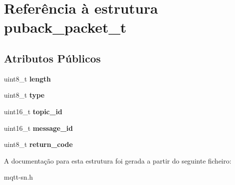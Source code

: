 \hypertarget{structpuback__packet__t}{\section{Referência à estrutura puback\+\_\+packet\+\_\+t}
\label{structpuback__packet__t}
}
\subsection*{Atributos Públicos}
\begin{DoxyCompactItemize}
\item 
\hypertarget{structpuback__packet__t_a9db1bf677b335fa42bef19b9a1258118}{uint8\+\_\+t {\bfseries length}}\label{structpuback__packet__t_a9db1bf677b335fa42bef19b9a1258118}

\item 
\hypertarget{structpuback__packet__t_af51f50c4aeb534b9bac1c4b69ec1b91c}{uint8\+\_\+t {\bfseries type}}\label{structpuback__packet__t_af51f50c4aeb534b9bac1c4b69ec1b91c}

\item 
\hypertarget{structpuback__packet__t_a4186f68a192e7b731be6abe6961fbf42}{uint16\+\_\+t {\bfseries topic\+\_\+id}}\label{structpuback__packet__t_a4186f68a192e7b731be6abe6961fbf42}

\item 
\hypertarget{structpuback__packet__t_a4f9d7e4ada5031181b84dcdfcfeeb1f2}{uint16\+\_\+t {\bfseries message\+\_\+id}}\label{structpuback__packet__t_a4f9d7e4ada5031181b84dcdfcfeeb1f2}

\item 
\hypertarget{structpuback__packet__t_a81e16e7cce73de6391f2c55eef484019}{uint8\+\_\+t {\bfseries return\+\_\+code}}\label{structpuback__packet__t_a81e16e7cce73de6391f2c55eef484019}

\end{DoxyCompactItemize}


A documentação para esta estrutura foi gerada a partir do seguinte ficheiro\+:\begin{DoxyCompactItemize}
\item 
mqtt-\/sn.\+h\end{DoxyCompactItemize}
